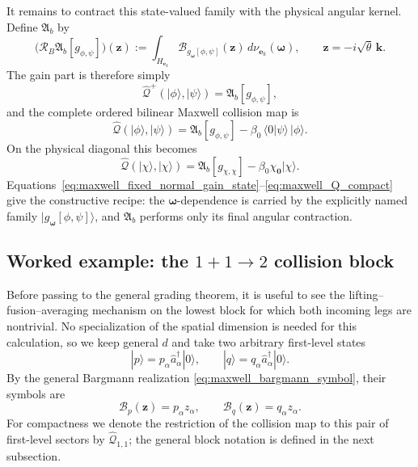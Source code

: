 \documentclass[11pt,oneside]{article}
\numberwithin{equation}{section}
\theoremstyle{definition}
\begin{document}
It remains to contract this state-valued family with the physical angular kernel.  Define $\mathfrak A_b$ by
\begin{equation}
\bigl(\mathcal R_B\mathfrak A_b[g_{\phi,\psi}]\bigr)(\bm z)
:=
\int_{H_{\bm e_k}}
\mathscr B_{g_{\bm\omega}[\phi,\psi]}(\bm z)
\,d\nu_{\bm e_k}(\bm\omega),
\qquad
\bm z=-i\sqrt\theta\,\bm k .
\label{eq:maxwell_angular_average_map}
\end{equation}
The gain part is therefore simply
\begin{equation}
\widehat{\mathcal Q}^{+}(|\phi\rangle,|\psi\rangle)
=
\mathfrak A_b[g_{\phi,\psi}],
\label{eq:maxwell_Q_gain_operator_recipe}
\end{equation}
and the complete ordered bilinear Maxwell collision map is
\begin{equation}
\widehat{\mathcal Q}(|\phi\rangle,|\psi\rangle)
=
\mathfrak A_b[g_{\phi,\psi}]
-
\beta_0\,\langle0|\psi\rangle\,|\phi\rangle .
\label{eq:maxwell_Q_compact_bilinear}
\end{equation}
On the physical diagonal this becomes
\begin{equation}
\widehat{\mathcal Q}(|\chi\rangle,|\chi\rangle)
=
\mathfrak A_b[g_{\chi,\chi}]
-
\beta_0\chi_{\bm0}|\chi\rangle .
\label{eq:maxwell_Q_compact}
\end{equation}
Equations~\eqref{eq:maxwell_fixed_normal_gain_state}--\eqref{eq:maxwell_Q_compact} give the constructive recipe: the $\bm\omega$-dependence is carried by the explicitly named family $|g_{\bm\omega}[\phi,\psi]\rangle$, and $\mathfrak A_b$ performs only its final angular contraction.


\subsection{Worked example: the \texorpdfstring{$1+1\to2$}{1+1 to 2} collision block}
\label{subsec:maxwell_worked_11_2}

Before passing to the general grading theorem, it is useful to see the lifting--fusion--averaging mechanism on the lowest block for which both incoming legs are nontrivial.  No specialization of the spatial dimension is needed for this calculation, so we keep general $d$ and take two arbitrary first-level states
\begin{equation}
|p\rangle
=
p_\alpha\hat a_\alpha^\dagger|0\rangle,
\qquad
|q\rangle
=
q_\alpha\hat a_\alpha^\dagger|0\rangle.
\label{eq:maxwell_worked_input_states}
\end{equation}
By the general Bargmann realization
\eqref{eq:maxwell_bargmann_symbol}, their symbols are
\begin{equation}
\mathscr B_p(\bm z)=p_\alpha z_\alpha,
\qquad
\mathscr B_q(\bm z)=q_\alpha z_\alpha.
\label{eq:maxwell_worked_input_symbols}
\end{equation}
For compactness we denote the restriction of the collision map to this pair of first-level sectors by $\widehat{\mathcal Q}_{1,1}$; the general block notation is defined in the next subsection.
\end{document}
